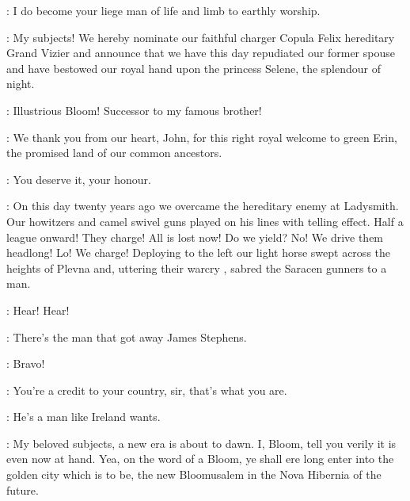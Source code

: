 \Peers:
I do become your liege man of life and limb to earthly worship.


\Bloom:
My subjects!
We hereby nominate our faithful charger Copula Felix hereditary Grand Vizier
and announce that we have this day repudiated our former spouse
and have bestowed our royal hand upon the princess Selene,
the splendour of night.


\Parnell:
Illustrious Bloom!
Successor to my famous brother!

\Bloom:
We thank you from our heart, John,
for this right royal welcome to green Erin,
the promised land of our common ancestors.


\Kernan:
You deserve it, your honour.

\Bloom:
On this day twenty years ago we overcame the hereditary enemy at Ladysmith.
Our howitzers and camel swivel guns played on his lines with telling effect.
Half a league onward!
They charge!
All is lost now!
Do we yield?
No!
We drive them headlong!
Lo! We charge!
Deploying to the left our light horse swept across the heights of Plevna
and, uttering their warcry ,
sabred the Saracen gunners to a man.

\Typesetters:
Hear! Hear!

\JohnWyse:
There's the man that got away James Stephens.

\Bluecoat:
Bravo!

\OldResident:
You're a credit to your country, sir, that's what you are.

\AppleWoman:
He's a man like Ireland wants.

\Bloom:
My beloved subjects, a new era is about to dawn.
I, Bloom, tell you verily it is even now at hand.
Yea, on the word of a Bloom, ye shall ere long
enter into the golden city which is to be, the new Bloomusalem
in the Nova Hibernia of the future.

